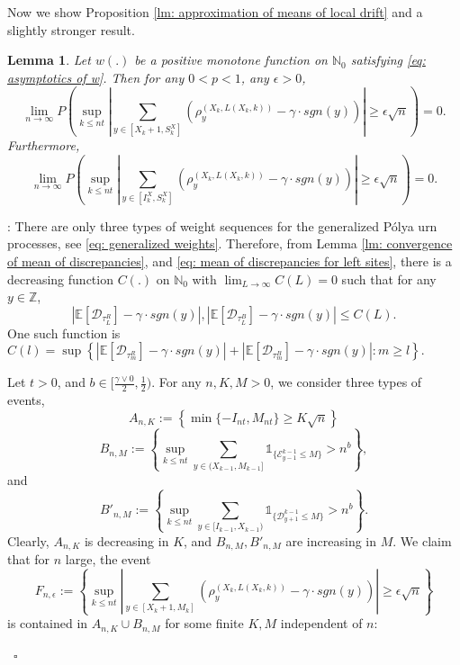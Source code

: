 \documentclass[twoside,12pt,a4paper]{article}
\newtheorem{lemma}{Lemma}[section]
\numberwithin{equation}{section}
\newenvironment{proof}{{\sc Proof}:}{~\hfill $\square$}
\newcommand{\abs}[1]{\left\vert #1 \right\vert}
\begin{document}
{		Now we show Proposition \ref{lm: approximation of means of local drift} and a slightly stronger result. 
		\begin{lemma}
			Let $w(.)$ be a positive monotone function on $\mathbb{N}_0$ satisfying \eqref{eq: asymptotics of w}. Then for any $0<p<1$, any $\epsilon>0$,
			$$
			\lim_{n\to\infty} P\left( \sup_{k\leq n t}  \abs{  	\sum_{y\in [X_{k}+1 ,S_{k}^X]} \left( \rho^{(X_k,L(X_k,k))}_y -  \gamma \cdot sgn(y) \right) } \geq  \epsilon \sqrt{n}     \right) =0.
			$$
			Furthermore,
		$$
	\lim_{n\to\infty} P\left( \sup_{k\leq n t}  \abs{  	\sum_{y\in [I_k^{X} ,S_{k}^X]} \left( \rho^{(X_k,L(X_k,k))}_y -  \gamma \cdot sgn(y) \right) } \geq  \epsilon \sqrt{n}     \right) =0.
	$$
\end{lemma}
\begin{proof} There are only three types of weight sequences for the generalized P\'{o}lya urn processes, see \eqref{eq: generalized weights}. Therefore, from Lemma \ref{lm: convergence of mean of discrepancies}, and \eqref{eq: mean of discrepancies for left sites}, there is a decreasing function $C(.)$ on $\mathbb{N}_0$ with $\lim_{L\to \infty}C(L) =0$ such that for any $y \in \mathbb{Z}$,
	\begin{equation}\label{eq: uniform convergence}
		\abs{\mathbb{E}\left[ \mathcal{D}_{\tau_L^R} \right] - \gamma \cdot sgn(y)}, \abs{\mathbb{E}\left[ \mathcal{D}_{\tau_L^B} \right] - \gamma \cdot sgn(y)} \leq C(L).
	\end{equation} One such function is $C(l) = \sup \left\{  \abs{\mathbb{E}\left[ \mathcal{D}_{\tau_m^R} \right] - \gamma \cdot sgn(y)} + \abs{\mathbb{E}\left[ \mathcal{D}_{\tau_m^B} \right] - \gamma \cdot sgn(y)} : m\geq l \right\}.     $  
	
	
	Let $t>0$, and $b \in [\frac{\gamma \vee 0 }{2},\frac{1}{2})$.  For any $n,K,M>0$, we consider three types of events, 
	$$A_{n,K}:=\left\{ \min\{-I_{nt}, M_{nt}\} \geq K \sqrt{n}  \right\}$$
	$$B_{n,M}:= \left\{  \sup_{k\leq n t} \sum_{ y\in (X_{k-1}, M_{k-1}]}  \mathbb{1}_{\{ \mathcal{E}^{k-1}_{y-1} \leq M  \}} >n^b  \right\},  $$
	and 
	$$B'_{n,M}:=  \left\{  \sup_{k\leq n t} \sum_{ y\in [I_{k-1}, X_{k-1})}  \mathbb{1}_{\{ \mathcal{D}^{k-1}_{y+1} \leq M  \}} >n^b  \right\}.$$
Clearly, $A_{n,K}$ is decreasing in $K$, and $B_{n,M}, B'_{n,M}$ are increasing in $M$. We claim that for $n$ large, the event 
$$
F_{n,\epsilon}:= \left\{ \sup_{k\leq n t}  \abs{  	\sum_{y\in [X_{k}+1 ,M_k]} \left( \rho^{(X_k,L(X_k,k))}_y -  \gamma \cdot sgn(y) \right) } \geq  \epsilon \sqrt{n}    \right \}$$ is contained in $A_{n,K} \cup B_{n,M} $ for some finite $K, M$ independent of $n$:   


\end{proof}}
\end{document}
